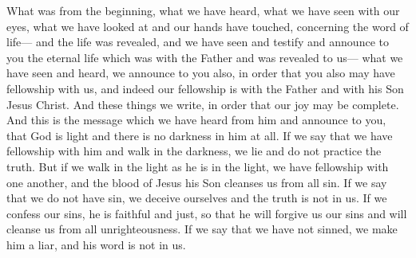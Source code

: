 
\begin{biblechapter} %
 What was from the beginning, what we have heard, what we have seen with our eyes, what we have looked at and our hands have touched, concerning the word of life—
\verse and the life was revealed, and we have seen and testify and announce to you the eternal life which was with the Father and was revealed to us—
\verse what we have seen and heard, we announce to you also, in order that you also may have fellowship with us, and indeed our fellowship is with the Father and with his Son Jesus Christ.
\verse And these things we write, in order that our joy may be complete.
 And this is the message which we have heard from him and announce to you, that God is light and there is no darkness in him at all.
\verse If we say that we have fellowship with him and walk in the darkness, we lie and do not practice the truth.
\verse But if we walk in the light as he is in the light, we have fellowship with one another, and the blood of Jesus his Son cleanses us from all sin.
\verse If we say that we do not have sin, we deceive ourselves and the truth is not in us.
\verse If we confess our sins, he is faithful and just, so that he will forgive us our sins and will cleanse us from all unrighteousness.
\verse If we say that we have not sinned, we make him a liar, and his word is not in us.
\end{biblechapter}

